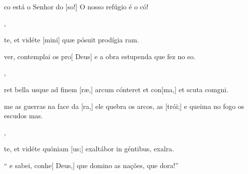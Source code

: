 {    {\item {}co está o Senhor do [so!] O nosso refúgio é o có!~\Antiphona},
  {\item {}te, et vidéte [mini] quæ pósuit prodígia ram.~\Antiphona}%
    {\item {} ver, contemplai os pro[ Deus] e a obra estupenda que fez no so.~\Antiphona},
  {\item {}ret bella usque ad finem [ræ,] arcum cónteret et con[ma,] et scuta comgni.~\Antiphona}%
    {\item {}me as guerras na face da [ra,] ele quebra os arcos, as [trói;] e queima no fogo os escudos mas.~\Antiphona},
  {\item {}te, et vidéte quóniam [us;] exaltábor in géntibus, exalra.~\Antiphona}%
    {\item {}`` e sabei, conhe[ Deus,] que domino as nações, que dora!''~\Antiphona}
}